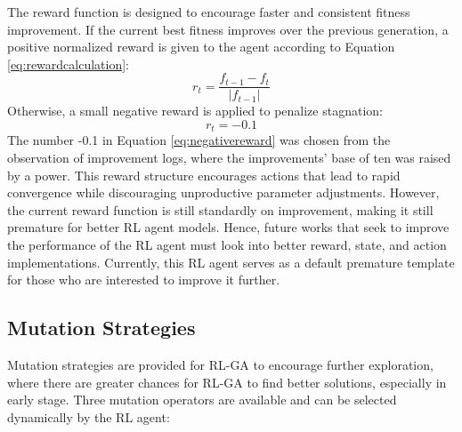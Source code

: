 \documentclass{article}
\begin{document}
The reward function is designed to encourage faster and consistent fitness improvement. If the current best fitness improves over the previous generation, a positive normalized reward is given to the agent according to Equation \ref{eq:rewardcalculation}:
\begin{equation}
    r_t = \frac{f_{t-1} - f_t}{|f_{t-1}|}
    \label{eq:rewardcalculation}
\end{equation}
Otherwise, a small negative reward is applied to penalize stagnation:
\begin{equation}
   r_t = -0.1 
   \label{eq:negativereward}
\end{equation}
The number -0.1 in Equation \ref{eq:negativereward} was chosen from the observation of improvement logs, where the improvements' base of ten was raised by a power. This reward structure encourages actions that lead to rapid convergence while discouraging unproductive parameter adjustments. However, the current reward function is still standardly on improvement, making it still premature for better RL agent models. Hence, future works that seek to improve the performance of the RL agent must look into better reward, state, and action implementations. Currently, this RL agent serves as a default premature template for those who are interested to improve it further.

\subsection{Mutation Strategies}

Mutation strategies are provided for RL-GA to encourage further exploration, where there are greater chances for RL-GA to find better solutions, especially in early stage. Three mutation operators are available and can be selected dynamically by the RL agent:
\end{document}
